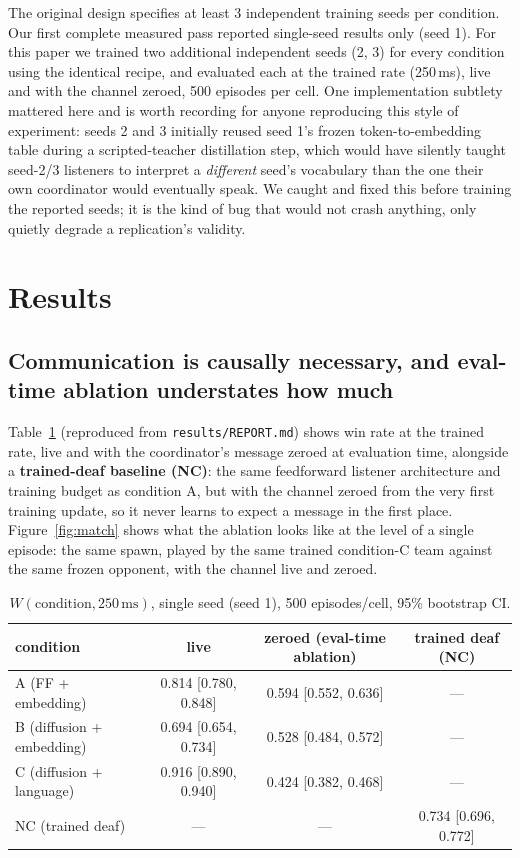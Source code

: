 \documentclass[11pt]{article}
\begin{document}
The original design specifies at least 3 independent training seeds per
condition. Our first complete measured pass reported single-seed
results only (seed 1). For this paper we trained two additional
independent seeds (2, 3) for every condition using the identical
recipe, and evaluated each at the trained rate (250\,ms), live and with
the channel zeroed, 500 episodes per cell. One implementation subtlety
mattered here and is worth recording for anyone reproducing this style
of experiment: seeds 2 and 3 initially reused seed 1's frozen
token-to-embedding table during a scripted-teacher distillation step,
which would have silently taught seed-2/3 listeners to interpret a
\emph{different} seed's vocabulary than the one their own coordinator
would eventually speak. We caught and fixed this before training the
reported seeds; it is the kind of bug that would not crash anything,
only quietly degrade a replication's validity.

\section{Results}

\subsection{Communication is causally necessary, and eval-time ablation
understates how much}
\label{sec:nc}

Table~\ref{tab:nc} (reproduced from \texttt{results/REPORT.md}) shows
win rate at the trained rate, live and with the coordinator's message
zeroed at evaluation time, alongside a \textbf{trained-deaf baseline
(NC)}: the same feedforward listener architecture and training budget
as condition A, but with the channel zeroed from the very first
training update, so it never learns to expect a message in the first
place. Figure~\ref{fig:match} shows what the ablation looks like at the
level of a single episode: the same spawn, played by the same trained
condition-C team against the same frozen opponent, with the channel live
and zeroed.

\begin{table}[ht]
\centering
\small
\begin{tabular}{@{}lccc@{}}
\toprule
condition & live & zeroed (eval-time ablation) & trained deaf (NC) \\
\midrule
A (FF + embedding)        & 0.814 [0.780, 0.848] & 0.594 [0.552, 0.636] & --- \\
B (diffusion + embedding) & 0.694 [0.654, 0.734] & 0.528 [0.484, 0.572] & --- \\
C (diffusion + language)  & 0.916 [0.890, 0.940] & 0.424 [0.382, 0.468] & --- \\
NC (trained deaf)         & --- & --- & 0.734 [0.696, 0.772] \\
\bottomrule
\end{tabular}
\caption{$W(\text{condition}, 250\,\text{ms})$, single seed (seed 1),
500 episodes/cell, 95\% bootstrap CI.}
\label{tab:nc}
\end{table}
\end{document}
